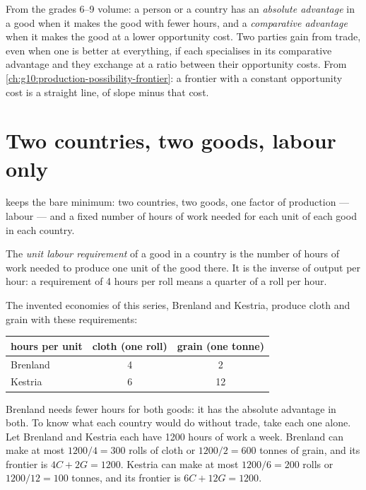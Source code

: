 \begin{recall}
From the grades 6--9 volume: a person or a country has an \emph{absolute advantage} in a good when it
makes the good with fewer hours, and a \emph{comparative advantage} when it makes the good at a lower
opportunity cost. Two parties gain from trade, even when one is better at everything, if each
specialises in its comparative advantage and they exchange at a ratio between their opportunity costs.
From \cref{ch:g10:production-possibility-frontier}: a frontier with a constant opportunity cost is a
straight line, of slope minus that cost.
\end{recall}

\section{Two countries, two goods, labour only}\label{sec:g10:ricardo-model:setup}

 keeps the bare minimum: two countries, two goods, one factor of production --- labour
--- and a fixed number of hours of work needed for each unit of each good in each country.

\begin{definition}\label{def:g10:ricardo-model:unit-labour-requirement}
The \emph{unit labour requirement} of a good in a country is the number of
hours of work needed to produce one unit of the good there. It is the inverse of output per hour: a
requirement of 4 hours per roll means a quarter of a roll per hour.
\end{definition}

The invented economies of this series, Brenland and Kestria, produce cloth and grain with these
requirements:

\begin{center}
\small
\begin{tabular}{lcc}
\toprule
hours per unit & cloth (one roll) & grain (one tonne) \\
\midrule
Brenland & 4 & 2 \\
Kestria & 6 & 12 \\
\bottomrule
\end{tabular}
\end{center}

Brenland needs fewer hours for both goods: it has the absolute advantage in both. To know what each
country would do without trade, take each one alone. Let Brenland and Kestria each have \num{1200} hours of
work a week. Brenland can make at most $1200/4 = 300$ rolls of cloth or $1200/2 = 600$ tonnes of grain, and
its frontier is $4C + 2G = 1200$. Kestria can make at most $1200/6 = 200$ rolls or $1200/12 = 100$ tonnes,
and its frontier is $6C + 12G = 1200$.

